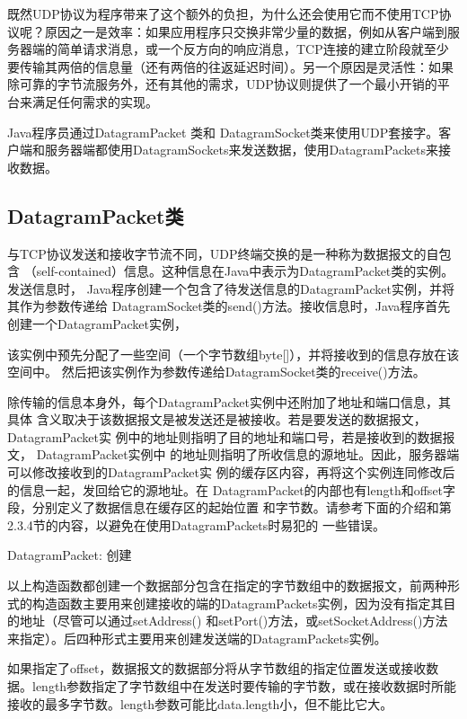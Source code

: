 	既然UDP协议为程序带来了这个额外的负担，为什么还会使用它而不使用TCP协议呢？原因之一是效率：如果应用程序只交换非常少量的数据，例如从客户端到服务器端的简单请求消息，或一个反方向的响应消息，TCP连接的建立阶段就至少要传输其两倍的信息量（还有两倍的往返延迟时间）。另一个原因是灵活性：如果除可靠的字节流服务外，还有其他的需求，UDP协议则提供了一个最小开销的平台来满足任何需求的实现。

	Java程序员通过DatagramPacket 类和 DatagramSocket类来使用UDP套接字。客户端和服务器端都使用DatagramSockets来发送数据，使用DatagramPackets来接收数据。 

	\subsection{DatagramPacket类} 

		与TCP协议发送和接收字节流不同，UDP终端交换的是一种称为数据报文的自包含
		（self-contained）信息。这种信息在Java中表示为DatagramPacket类的实例。发送信息时，
		Java程序创建一个包含了待发送信息的DatagramPacket实例，并将其作为参数传递给
		DatagramSocket类的send()方法。接收信息时，Java程序首先创建一个DatagramPacket实例，

		该实例中预先分配了一些空间（一个字节数组byte[]），并将接收到的信息存放在该空间中。
		然后把该实例作为参数传递给DatagramSocket类的receive()方法。 

		除传输的信息本身外，每个DatagramPacket实例中还附加了地址和端口信息，其具体
		含义取决于该数据报文是被发送还是被接收。若是要发送的数据报文， DatagramPacket实
		例中的地址则指明了目的地址和端口号，若是接收到的数据报文， DatagramPacket实例中
		的地址则指明了所收信息的源地址。因此，服务器端可以修改接收到的DatagramPacket实
		例的缓存区内容，再将这个实例连同修改后的信息一起，发回给它的源地址。在
		DatagramPacket的内部也有length和offset字段，分别定义了数据信息在缓存区的起始位置
		和字节数。请参考下面的介绍和第2.3.4节的内容，以避免在使用DatagramPackets时易犯的
		一些错误。 

		DatagramPacket: 创建 

		

		以上构造函数都创建一个数据部分包含在指定的字节数组中的数据报文，前两种形式的构造函数主要用来创建接收的端的DatagramPackets实例，因为没有指定其目的地址（尽管可以通过setAddress() 和setPort()方法，或setSocketAddress()方法来指定）。后四种形式主要用来创建发送端的DatagramPackets实例。 

		如果指定了offset，数据报文的数据部分将从字节数组的指定位置发送或接收数据。length参数指定了字节数组中在发送时要传输的字节数，或在接收数据时所能接收的最多字节数。length参数可能比data.length小，但不能比它大。 

